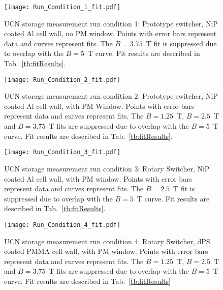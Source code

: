 \begin{figure}[htp]
    \centering
    \texttt{[image: Run\_Condition\_1\_fit.pdf]}
    \caption[UCN storage measurement run condition 1: Prototype switcher, NiP coated Al cell wall, no PM window.]{UCN storage measurement run condition 1: Prototype switcher, NiP coated Al cell wall, no PM window. Points with error bars represent data and curves represent fits. The $B=3.75$~T fit is suppressed due to overlap with the $B=5$~T curve. Fit results are described in Tab.~\ref{tb:fitResults}.}
    \label{fig:runCondition1_fit}
\end{figure}

\begin{figure}[htp]
    \centering
    \texttt{[image: Run\_Condition\_2\_fit.pdf]}
    \caption[UCN storage measurement run condition 2: Prototype switcher, NiP coated Al cell wall, with PM Window.]{UCN storage measurement run condition 2: Prototype switcher, NiP coated Al cell wall, with PM Window. Points with error bars represent data and curves represent fits. The $B=1.25$~T, $B=2.5$~T and $B=3.75$~T fits are suppressed due to overlap with the $B=5$~T curve. Fit results are described in Tab.~\ref{tb:fitResults}.}
    \label{fig:runCondition2_fit}
\end{figure}

\begin{figure}[htp]
    \centering
    \texttt{[image: Run\_Condition\_3\_fit.pdf]}
    \caption[UCN storage measurement run condition 3: Rotary Switcher, NiP coated Al cell wall, with PM window.]{UCN storage measurement run condition 3: Rotary Switcher, NiP coated Al cell wall, with PM window. Points with error bars represent data and curves represent fits. The $B=2.5$~T fit is suppressed due to overlap with the $B=5$~T curve. Fit results are described in Tab.~\ref{tb:fitResults}.}
    \label{fig:runCondition3_fit}
\end{figure}

\begin{figure}[htp]
    \centering
    \texttt{[image: Run\_Condition\_4\_fit.pdf]}
    \caption[UCN storage measurement run condition 4: Rotary Switcher, dPS coated PMMA cell wall, with PM window.]{UCN storage measurement run condition 4: Rotary Switcher, dPS coated PMMA cell wall, with PM window. Points with error bars represent data and curves represent fits. The $B=1.25$~T, $B=2.5$~T and $B=3.75$~T fits are suppressed due to overlap with the $B=5$~T curve. Fit results are described in Tab.~\ref{tb:fitResults}}
    \label{fig:runCondition4_fit}
\end{figure}

